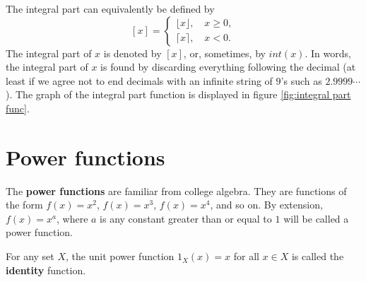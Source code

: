 The integral part can equivalently be defined
by
\[
 \left[x\right]=
 \begin{cases}
  \lfloor x \rfloor, \quad x \geq 0, \\
  \lceil x \rceil, \quad x < 0.
 \end{cases}
\]
The integral part of $x$
 is denoted
by $[x]$, or, sometimes, by $int(x)$. In words, the integral part of $x$ is found by discarding everything
following the decimal (at least if we agree not to end decimals with
an infinite string of $9$'s such as $2.9999\cdots$). The graph of the integral part
function is displayed in figure \ref{fig:integral part func}.


\section{Power functions}
The {\bfseries power functions} are familiar from college algebra. They are
functions of the form $f(x) = x^2$, $f(x)=x^3$, $f(x)=x^4$, and so on.
By extension, $f(x) = x^a$, where $a$ is any constant greater than
or equal to $1$ will be called a power function. 

For any set $X$, the unit power function $1_{X}(x) = x$ for all $x\in X$ is called the
{\bfseries identity} function.

